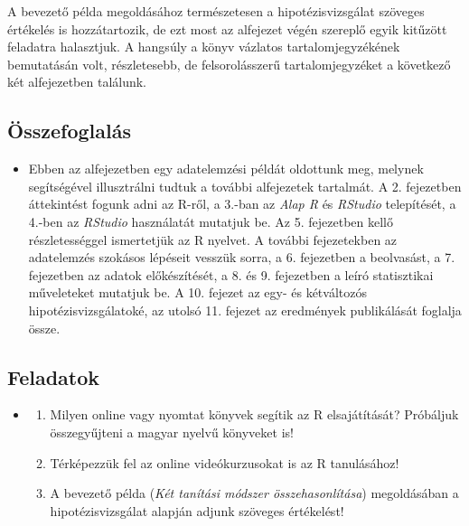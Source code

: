\documentclass[
]{book}
\providecommand{\tightlist}{%
  \setlength{\itemsep}{0pt}\setlength{\parskip}{0pt}}
\newenvironment{rmdblock}[1]
  {\begin{shaded*}
  \begin{itemize}
  \renewcommand{\labelitemi}{
    \raisebox{-.7\height}[0pt][0pt]{
      {\setkeys{Gin}{width=3em,keepaspectratio}\texttt{[image: images/\#1]}}
    }
  }
  \item
  }
  {
  \end{itemize}
  \end{shaded*}
  }
\newenvironment{rmdsummary}
  {\begin{rmdblock}{summary}}
  {\end{rmdblock}}
\newenvironment{rmdexercise}
  {\begin{rmdblock}{exercise}}
  {\end{rmdblock}}
\begin{document}
A bevezető példa megoldásához természetesen a hipotézisvizsgálat szöveges értékelés is hozzátartozik, de ezt most az alfejezet végén szereplő egyik kitűzött feladatra halasztjuk. A hangsúly a könyv vázlatos tartalomjegyzékének bemutatásán volt, részletesebb, de felsorolásszerű tartalomjegyzéket a következő két alfejezetben találunk.

\hypertarget{itt-kezdodik-1-summary}{%
\subsection{Összefoglalás}\label{itt-kezdodik-1-summary}}

\begin{rmdsummary}
Ebben az alfejezetben egy adatelemzési példát oldottunk meg, melynek
segítségével illusztrálni tudtuk a további alfejezetek tartalmát. A 2.
fejezetben áttekintést fogunk adni az R-ről, a 3.-ban az \emph{Alap R}
és \emph{RStudio} telepítését, a 4.-ben az \emph{RStudio} használatát
mutatjuk be. Az 5. fejezetben kellő részletességgel ismertetjük az R
nyelvet. A további fejezetekben az adatelemzés szokásos lépéseit vesszük
sorra, a 6. fejezetben a beolvasást, a 7. fejezetben az adatok
előkészítését, a 8. és 9. fejezetben a leíró statisztikai műveleteket
mutatjuk be. A 10. fejezet az egy- és kétváltozós hipotézisvizsgálatoké,
az utolsó 11. fejezet az eredmények publikálását foglalja össze.
\end{rmdsummary}

\hypertarget{itt-kezdodik-1-exercise}{%
\subsection{Feladatok}\label{itt-kezdodik-1-exercise}}

\begin{rmdexercise}
\begin{enumerate}
\def\labelenumi{\arabic{enumi}.}
\tightlist
\item
  Milyen online vagy nyomtat könyvek segítik az R elsajátítását?
  Próbáljuk összegyűjteni a magyar nyelvű könyveket is!
\item
  Térképezzük fel az online videókurzusokat is az R tanulásához!
\item
  A bevezető példa (\emph{Két tanítási módszer összehasonlítása})
  megoldásában a hipotézisvizsgálat alapján adjunk szöveges értékelést!
\end{enumerate}
\end{rmdexercise}
\end{document}
